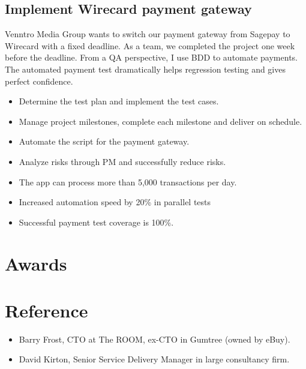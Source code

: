\documentclass[a4paper]{twentysecondcv-english} %
\begin{document}
\newpage %
\makesidebar

\subsection{Implement Wirecard payment gateway}

Venntro Media Group wants to switch our payment gateway from Sagepay to Wirecard with a fixed deadline. As a team, we completed the project one week before the deadline. From a QA perspective, I use BDD to automate payments. The automated payment test dramatically helps regression testing and gives perfect confidence.
\begin{itemize}
    \item Determine the test plan and implement the test cases.
    \item Manage project milestones, complete each milestone and deliver on schedule.
    \item Automate the script for the payment gateway.
    \item Analyze risks through PM and successfully reduce risks.
    \item The app can process more than 5,000 transactions per day.
    \item Increased automation speed by 20\% in parallel tests
    \item Successful payment test coverage is 100\%.
\end{itemize}

\section{Awards}

\begin{twentyshort} %
\end{twentyshort}

\section{Reference}
\begin{itemize}
    \item Barry Frost, CTO at The ROOM, ex-CTO in Gumtree (owned by eBuy).
    \item David Kirton, Senior Service Delivery Manager in large consultancy firm.
\end{itemize}
\end{document}
